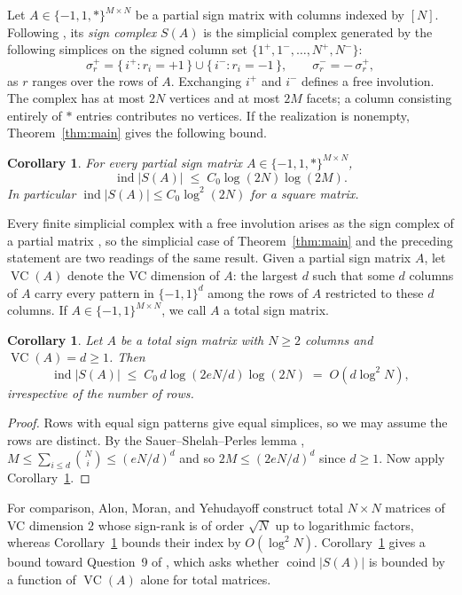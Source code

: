 \documentclass[11pt]{article}
\newtheorem{corollary}[theorem]{Corollary}
\theoremstyle{remark}
\begin{document}
Let $A \in \{-1,1,*\}^{M \times N}$ be a partial sign matrix with
columns indexed by $[N]$. Following \cite[Section~3.1]{FHV}, its
\emph{sign complex} $S(A)$ is the simplicial complex generated by
the following simplices on the signed column set
$\{1^{+},1^{-},\dots,N^{+},N^{-}\}$:
\[
  \sigma_r^{+}
  = \{\, i^{+} : r_i = +1 \,\}
    \cup \{\, i^{-} : r_i = -1 \,\},
  \qquad
  \sigma_r^{-} = -\,\sigma_r^{+},
\]
as $r$ ranges over the rows of $A$. Exchanging $i^{+}$ and $i^{-}$
defines a free involution. The complex has at most $2N$ vertices
and at most $2M$ facets; a column consisting entirely of $*$ entries
contributes no vertices. If the realization is nonempty,
Theorem~\ref{thm:main} gives the following bound. 

\begin{corollary}\label{cor:sign}
For every partial sign matrix $A \in \{-1,1,*\}^{M\times N}$,
\[
  \operatorname{ind} |S(A)|
  \;\le\; C_0 \log(2N)\log(2M).
\]
In particular $\operatorname{ind}|S(A)| \le C_0 \log^2(2N)$
for a square matrix.
\end{corollary}
Every finite simplicial complex with a free involution arises as the sign complex of a partial matrix \cite[Lemma~15]{FHV}, so the simplicial case of
Theorem~\ref{thm:main} and the preceding statement are two readings
of the same result. Given a partial sign matrix $A$, let $\operatorname{VC}(A)$ denote the VC dimension of $A$: the largest $d$ such that some $d$ columns of $A$ carry every pattern in $\{-1, 1\}^d$ among the rows of $A$ restricted to these $d$ columns. If $A \in \{-1, 1\}^{M \times N}$, we call $A$ a total sign matrix.

\begin{corollary}\label{cor:total}
Let $A$ be a total sign matrix with $N \ge 2$ columns and
$\operatorname{VC}(A) = d \ge 1$.
Then
\[
  \operatorname{ind} |S(A)|
  \;\le\; C_0 \, d \log(2eN/d) \log(2N)
  \;=\; O(d \log^2 N),
\]
irrespective of the number of rows.
\end{corollary}

\begin{proof}
Rows with equal sign patterns give equal simplices, so we may
assume the rows are distinct. By the Sauer--Shelah--Perles lemma
\cite{Sauer},
$M \le \sum_{i \le d}\binom{N}{i} \le (eN/d)^d$ and so
$2M \le (2eN/d)^{d}$ since $d \ge 1$.
Now apply Corollary~\ref{cor:sign}.
\end{proof}

For comparison, Alon, Moran, and Yehudayoff \cite{AMY} construct
total $N\times N$ matrices of VC dimension $2$ whose sign-rank
is of order $\sqrt N$ up to logarithmic factors, whereas
Corollary~\ref{cor:total} bounds their index by $O(\log^2 N)$.
Corollary~\ref{cor:total} gives a bound toward Question~9 of \cite{FHV},
which asks whether $\operatorname{coind}|S(A)|$ is bounded by a
function of $\operatorname{VC}(A)$ alone for total matrices.
\end{document}
